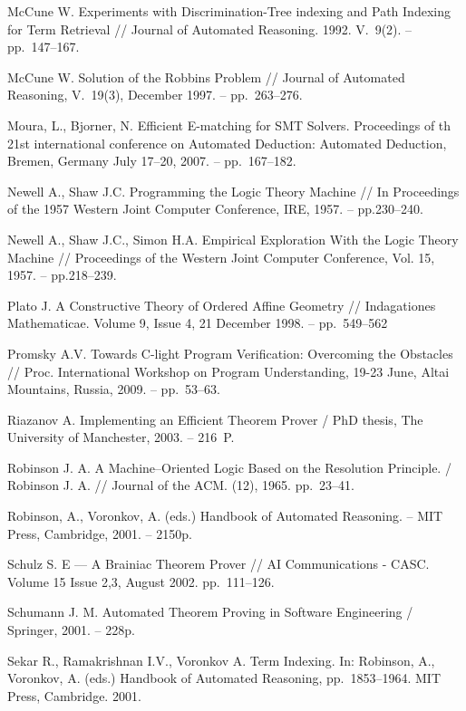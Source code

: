 \begin{thebibliography}{99}
 McCune W. Experiments with Discrimination-Tree indexing and Path Indexing for Term Retrieval // Journal of Automated Reasoning. 1992. V.~9(2). -- pp.~147--167.

 McCune W. Solution of the Robbins Problem // Journal of Automated Reasoning, V.~19(3), December 1997. -- pp.~263--276.

 Moura, L., Bjorner, N. Efficient E-matching for SMT Solvers. Proceedings of th 21st international conference on Automated Deduction: Automated Deduction, Bremen, Germany July 17--20, 2007. -- pp.~167--182.

 Newell A., Shaw J.C. Programming the Logic Theory Machine // In Proceedings of the 1957 Western Joint Computer Conference, IRE, 1957. -- pp.230--240.

 Newell A., Shaw J.C., Simon H.A. Empirical Exploration With the Logic Theory Machine // Proceedings of the Western Joint Computer Conference, Vol. 15, 1957. -- pp.218--239.

 Plato J. A Constructive Theory of Ordered Affine Geometry // Indagationes Mathematicae. Volume 9, Issue 4, 21 December 1998. -- pp.~549--562

 Promsky A.V. Towards C-light Program Verification: Overcoming the Obstacles // Proc. International Workshop on Program Understanding, 19-23 June, Altai Mountains, Russia, 2009. -- pp.~53--63.

 Riazanov A. Implementing an Efficient Theorem Prover /  PhD thesis, The University of Manchester, 2003. -- 216~P.

 Robinson J. A. A Machine--Oriented Logic Based on the Resolution Principle. / Robinson J. A. //  Journal of the ACM. (12), 1965. pp.~23--41.

 Robinson, A., Voronkov, A. (eds.) Handbook of Automated Reasoning. -- MIT Press, Cambridge, 2001. -- 2150p.

 Schulz S. E --- A Brainiac Theorem Prover // AI Communications - CASC. Volume 15 Issue 2,3, August 2002. pp.~111--126.

 Schumann J. M. Automated Theorem Proving in Software Engineering / Springer, 2001. -- 228p.

 Sekar R., Ramakrishnan I.V., Voronkov A. Term Indexing. In: Robinson, A., Voronkov, A. (eds.) Handbook of Automated Reasoning, pp.~1853--1964. MIT Press, Cambridge. 2001.


\end{thebibliography}
